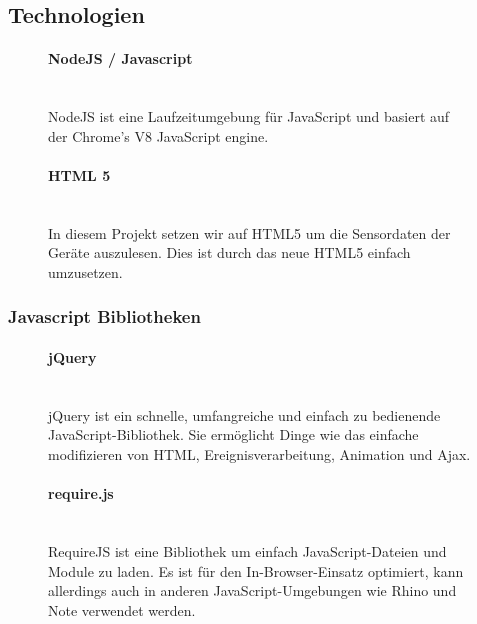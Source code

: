 \documentclass[a4paper]{spie}  %
\begin{document}
\subsection{Technologien} %
\begin{figure}[H]
\begin{minipage}[t]{0.4\textwidth}
\vspace{0pt}
\paragraph{NodeJS / Javascript}\mbox{}\\
NodeJS ist eine Laufzeitumgebung für JavaScript und basiert auf der Chrome's V8 JavaScript engine. 

\end{minipage}
\hfill
\begin{minipage}[t]{0.5\textwidth}
\vspace{0pt}
\paragraph{HTML 5}\mbox{}\\
In diesem Projekt setzen wir auf HTML5 um die Sensordaten der Geräte auszulesen. Dies ist durch das neue HTML5 einfach umzusetzen.
\end{minipage}
\end{figure}

\subsubsection{Javascript Bibliotheken}

\begin{figure}[H]
\begin{minipage}[t]{0.4\textwidth}
\vspace{0pt}
\paragraph{jQuery}\mbox{}\\
jQuery ist ein schnelle, umfangreiche und einfach zu bedienende JavaScript-Bibliothek. Sie ermöglicht Dinge wie das einfache modifizieren von HTML, Ereignisverarbeitung, Animation und Ajax.
\end{minipage}
\hfill
\begin{minipage}[t]{0.5\textwidth}
\vspace{0pt}
\paragraph{require.js}\mbox{}\\
RequireJS ist eine Bibliothek um einfach JavaScript-Dateien und Module zu laden. Es ist für den In-Browser-Einsatz optimiert, kann allerdings auch in anderen JavaScript-Umgebungen wie Rhino und Note verwendet werden.
\end{minipage}
\end{figure}
\end{document}
